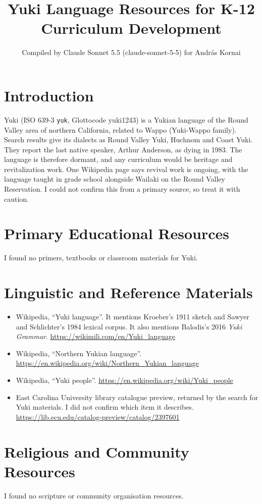 \documentclass[12pt]{article}
\title{Yuki Language Resources for K-12 Curriculum Development}
\author{Compiled by Claude Sonnet 5.5 (claude-sonnet-5-5) for Andr\'as Kornai}
\date{}
\begin{document}
\maketitle

\section{Introduction}
Yuki (ISO 639-3 \texttt{yuk}, Glottocode yuki1243) is a Yukian language of the Round Valley area of northern California, related to Wappo (Yuki-Wappo family). Search results give its dialects as Round Valley Yuki, Huchnom and Coast Yuki. They report the last native speaker, Arthur Anderson, as dying in 1983. The language is therefore dormant, and any curriculum would be heritage and revitalization work. One Wikipedia page says revival work is ongoing, with the language taught in grade school alongside Wailaki on the Round Valley Reservation. I could not confirm this from a primary source, so treat it with caution.

\section{Primary Educational Resources}
I found no primers, textbooks or classroom materials for Yuki.

\section{Linguistic and Reference Materials}
\begin{itemize}
\item Wikipedia, ``Yuki language''. It mentions Kroeber's 1911 sketch and Sawyer and Schlichter's 1984 lexical corpus. It also mentions Balodis's 2016 \emph{Yuki Grammar}. \url{https://wikimili.com/en/Yuki_language}
\item Wikipedia, ``Northern Yukian language''. \url{https://en.wikipedia.org/wiki/Northern_Yukian_language}
\item Wikipedia, ``Yuki people''. \url{https://en.wikipedia.org/wiki/Yuki_people}
\item East Carolina University library catalogue preview, returned by the search for Yuki materials. I did not confirm which item it describes. \url{https://lib.ecu.edu/catalog-preview/catalog/2397601}
\end{itemize}

\section{Religious and Community Resources}
I found no scripture or community organisation resources.
\end{document}
